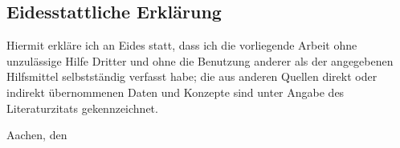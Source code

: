 \subsection*{Eidesstattliche Erklärung}
Hiermit erkläre ich an Eides statt, dass ich die vorliegende Arbeit ohne unzulässige Hilfe Dritter und ohne die Benutzung anderer als der angegebenen Hilfsmittel selbst\-ständig verfasst habe; die aus anderen Quellen direkt oder indirekt übernommenen Daten und Konzepte sind unter Angabe des Literaturzitats gekennzeichnet.

\vspace{2cm}

Aachen, den \submitdate


